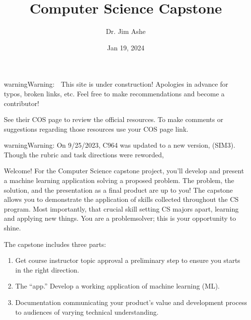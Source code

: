 \documentclass[letterpaper,10pt,english]{jupyterBook}
\title{Computer Science Capstone}
\date{Jan 19, 2024}
\author{Dr.\@{} Jim Ashe}
\begin{document}
\pagestyle{empty}
\sphinxmaketitle
\pagestyle{plain}
\sphinxtableofcontents
\pagestyle{normal}
\label{\detokenize{intro::doc}}




\begin{sphinxadmonition}{warning}{Warning:}
\sphinxAtStartPar
🚧 This site is under construction! Apologies in advance for typos, broken links, etc. Feel free to make recommendations and become a contributor! 👷🏽‍♀️

\sphinxAtStartPar
{} See their COS page to review the official resources. To make comments or suggestions regarding those resources use your COS page  link.
\end{sphinxadmonition}

\begin{sphinxadmonition}{warning}{Warning:}
\sphinxAtStartPar
On 9/25/2023, C964 was updated to a new version, (SIM3). Though the rubric and task directions were reworded, 
\end{sphinxadmonition}





\sphinxAtStartPar
Welcome! For the Computer Science capstone project, you’ll develop and present a machine learning application solving a proposed problem. The problem, the solution, and the presentation as a final product are up to you! The capstone allows you to demonstrate the application of skills collected throughout the CS program. Most importantly, that crucial skill setting CS majors apart, learning and applying new things. You are a problem\sphinxhyphen{}solver; this is your opportunity to shine.

\sphinxAtStartPar
The capstone includes three parts:
\begin{enumerate}
%
\item {} 
\sphinxAtStartPar
{} Get course instructor topic approval \sphinxhyphen{}a preliminary step to ensure you starts in the right direction.

\item {} 
\sphinxAtStartPar
{} The “app.” Develop a working application of machine learning (ML).

\item {} 
\sphinxAtStartPar
{} Documentation communicating your product’s value and development process to audiences of varying technical understanding.

\end{enumerate}
\end{document}
